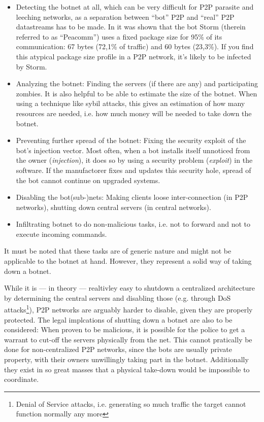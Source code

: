 \documentclass{llncs}
\begin{document}
\begin{itemize}
\item Detecting the botnet at all, which can be very difficult for P2P
  parasite and leeching networks, as a separation between ``bot'' P2P
  and ``real'' P2P datastreams has to be made. In
  \cite{steggink2007detection} it was shown that the bot Storm
  (therein referred to as ``Peacomm'') uses a fixed package size for
  95\% of its communication: 67 bytes (72,1\% of traffic) and 60 bytes
  (23,3\%). If you find this atypical package size profile in a P2P
  network, it's likely to be infected by Storm.
\item Analyzing the botnet: Finding the servers (if there are any) and
  participating zombies. It is also helpful to be able to estimate the
  size of the botnet. When using a technique like sybil attacks, this
  gives an estimation of how many resources are needed, i.e. how much
  money will be needed to take down the botnet.
\item Preventing further spread of the botnet: Fixing the security
  exploit of the bot's injection vector. Most often, when a bot
  installs itself unnoticed from the owner ({\it injection}), it does so by
  using a security problem ({\it exploit}) in the software. If the
  manufactorer fixes and updates this security hole, spread of the bot
  cannot continue on upgraded systems.
\item Disabling the bot(sub-)nets: Making clients loose
  inter-connection (in P2P networks), shutting down central servers
  (in central networks).
\item Infiltrating botnet to do non-malicious tasks, i.e. not to
  forward and not to execute incoming commands.
\end{itemize}

It must be noted that these tasks are of generic nature and might not
be applicable to the botnet at hand. However, they represent a solid
way of taking down a botnet.

While it is --- in theory --- realtivley easy to shutdown a
centralized architecture by determining the central servers and
disabling those (e.g. through DoS attacks\footnote{Denial of Service
  attacks, i.e. generating so much traffic the target cannot function
  normally any more}), P2P networks are arguably harder to disable,
given they are properly protected. The legal implcations of shutting
down a botnet are also to be considered: When proven to be malicious,
it is possible for the police to get a warrant to cut-off the servers
physically from the net. This cannot pratically be done for
non-centralized P2P networks, since the bots are usually private
property, with their owners unwillingly taking part in the
botnet. Additionally they exist in so great masses that a physical
take-down would be impossible to coordinate.
\end{document}
